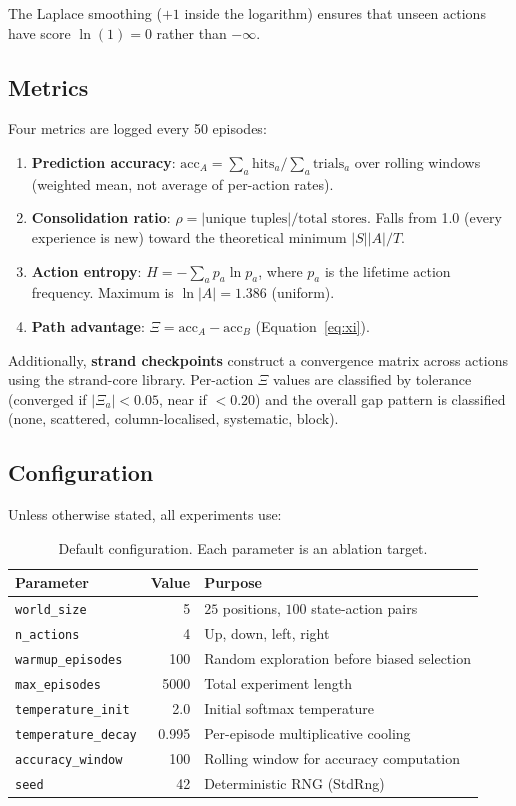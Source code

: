 \documentclass[11pt,a4paper]{article}
\begin{document}
The Laplace smoothing ($+1$ inside the logarithm) ensures that unseen actions have score $\ln(1) = 0$ rather than $-\infty$.

\subsection{Metrics}

Four metrics are logged every 50 episodes:

\begin{enumerate}[nosep]
    \item \textbf{Prediction accuracy}: $\text{acc}_A = \sum_a \text{hits}_a / \sum_a \text{trials}_a$ over rolling windows (weighted mean, not average of per-action rates).
    \item \textbf{Consolidation ratio}: $\rho = |\text{unique tuples}| / \text{total stores}$. Falls from 1.0 (every experience is new) toward the theoretical minimum $|S||A| / T$.
    \item \textbf{Action entropy}: $H = -\sum_a p_a \ln p_a$, where $p_a$ is the lifetime action frequency. Maximum is $\ln |A| = 1.386$ (uniform).
    \item \textbf{Path advantage}: $\Xi = \text{acc}_A - \text{acc}_B$ (Equation~\ref{eq:xi}).
\end{enumerate}

Additionally, \textbf{strand checkpoints} construct a convergence matrix across actions using the strand-core library. Per-action $\Xi$ values are classified by tolerance (converged if $|\Xi_a| < 0.05$, near if $< 0.20$) and the overall gap pattern is classified (none, scattered, column-localised, systematic, block).

\subsection{Configuration}

Unless otherwise stated, all experiments use:

\begin{table}[H]
\centering
\begin{tabular}{lrl}
\toprule
Parameter & Value & Purpose \\
\midrule
\texttt{world\_size} & 5 & $25$ positions, $100$ state-action pairs \\
\texttt{n\_actions} & 4 & Up, down, left, right \\
\texttt{warmup\_episodes} & 100 & Random exploration before biased selection \\
\texttt{max\_episodes} & 5000 & Total experiment length \\
\texttt{temperature\_init} & 2.0 & Initial softmax temperature \\
\texttt{temperature\_decay} & 0.995 & Per-episode multiplicative cooling \\
\texttt{accuracy\_window} & 100 & Rolling window for accuracy computation \\
\texttt{seed} & 42 & Deterministic RNG (StdRng) \\
\bottomrule
\end{tabular}
\caption{Default configuration. Each parameter is an ablation target.}
\label{tab:config}
\end{table}
\end{document}
